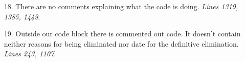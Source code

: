 \begin{itemize}
\item [18.] There are no comments explaining what the code is doing. \textit{Lines 1319, 1385, 1449}.

\item [19.] Outside our code block there is commented out code. It doesn't contain neither reasons for being eliminated nor date for the definitive elimination. \textit{Lines 243, 1107}. 

\end{itemize}